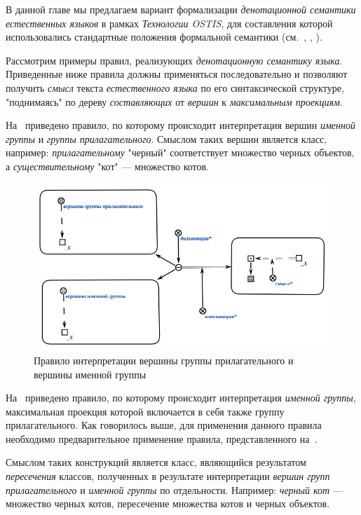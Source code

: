 В данной главе мы предлагаем вариант формализации \textit{денотационной семантики} \textit{естественных языков} в рамках \textit{Технологии OSTIS}, для составления которой использовались стандартные положения формальной семантики (см.~, , ).

Рассмотрим примеры правил, реализующих \textit{денотационную семантику} \textit{языка}.
Приведенные ниже правила должны применяться последовательно и позволяют получить \textit{смысл} текста \textit{естественного языка} по его синтаксической структуре, "поднимаясь"{} по дереву \textit{составляющих} от \textit{вершин} к \textit{максимальным проекциям}.

На~\textit{} приведено правило, по которому происходит интерпретация вершин \textit{именной группы} и \textit{группы прилагательного}.
Смыслом таких вершин является класс, например: \textit{прилагательному} "черный"{} соответствует множество черных объектов, а \textit{существительному} "кот"{} --- множество котов.

\begin{figure}[H]
    \centering
    \includegraphics[scale=0.8]{images/part2/chapter_lang/d_sem_1}
    \caption{Правило интерпретации вершины группы прилагательного и вершины именной группы}
    \label{fig:d_sem_1}
\end{figure}

На~\textit{} приведено правило, по которому происходит интерпретация \textit{именной группы}, максимальная проекция которой включается в себя также группу прилагательного.
Как говорилось выше, для применения данного правила необходимо предварительное применение правила, представленного на~\textit{}.

Смыслом таких конструкций является класс, являющийся результатом \textit{пересечения} классов, полученных в результате интерпретации \textit{вершин} \textit{групп прилагательного} и \textit{именной группы} по отдельности.
Например: \textit{черный кот} --- множество черных котов, пересечение множества котов и черных объектов. %

